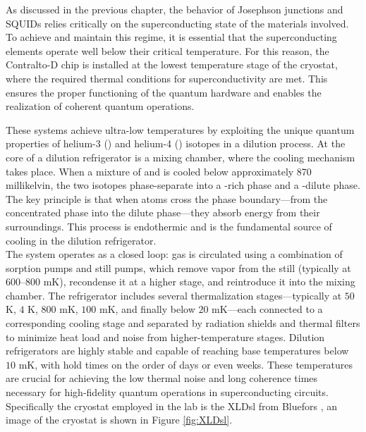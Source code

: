 As discussed in the previous chapter, the behavior of Josephson junctions and SQUIDs relies critically on the superconducting state of the materials involved. 
To achieve and maintain this regime, it is essential that the superconducting elements operate well below their critical temperature. 
For this reason, the Contralto-D chip is installed at the lowest temperature stage of the cryostat, where the required thermal conditions for superconductivity are met. 
This ensures the proper functioning of the quantum hardware and enables the realization of coherent quantum operations.

These systems achieve ultra-low temperatures by exploiting the unique quantum properties of helium-3 () and helium-4 () isotopes in a dilution process.
At the core of a dilution refrigerator is a mixing chamber, where the cooling mechanism takes place. 
When a mixture of  and  is cooled below approximately 870 millikelvin, the two isotopes phase-separate into a -rich phase and a -dilute phase. 
The key principle is that when  atoms cross the phase boundary—from the concentrated phase into the dilute phase—they absorb energy from their surroundings. 
This process is endothermic and is the fundamental source of cooling in the dilution refrigerator.\\
The system operates as a closed loop:  gas is circulated using a combination of sorption pumps and still pumps, which remove  vapor from the still (typically at $600–800$ mK), recondense it at a higher stage, and reintroduce it into the mixing chamber. 
The refrigerator includes several thermalization stages—typically at $50$ K, $4$ K, $800$ mK, $100$ mK, and finally below $20$ mK—each connected to a corresponding cooling stage and separated by radiation shields and thermal filters to minimize heat load and noise from higher-temperature stages.
Dilution refrigerators are highly stable and capable of reaching base temperatures below $10$ mK, with hold times on the order of days or even weeks. 
These temperatures are crucial for achieving the low thermal noise and long coherence times necessary for high-fidelity quantum operations in superconducting circuits.
Specifically the cryostat employed in the lab is the XLDsl from Bluefors \cite{XLD1000}, an image of the cryostat is shown in Figure \ref{fig:XLDsl}.

